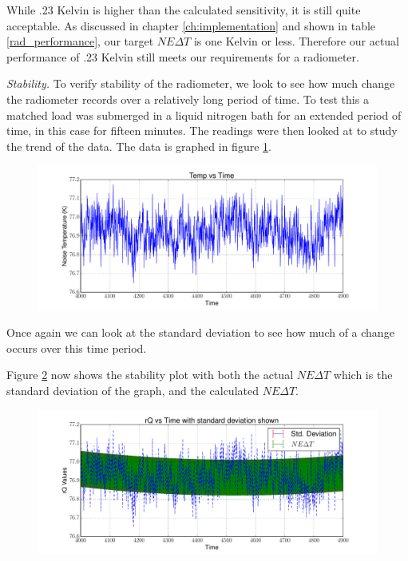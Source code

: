 {While .23 Kelvin is higher than the calculated sensitivity, it is still quite acceptable.  As discussed in chapter \ref{ch:implementation} and shown in table \ref{rad_performance}, our target $NE\Delta T$ is one Kelvin or less.  Therefore our actual performance of .23 Kelvin still meets our requirements for a radiometer.

\emph{Stability.}  To verify stability of the radiometer, we look to see how much change the radiometer records over a relatively long period of time.  To test this a matched load was submerged in a liquid nitrogen bath for an extended period of time, in this case for fifteen minutes.  The readings were then looked at to study the trend of the data.  The data is graphed in figure \ref{Stability}.

\begin{figure}[h!tb] \centering
\includegraphics[width=\textwidth]{Experiments/Exp2/sdr_calibrated_zoom.pdf}
\label{Stability}
\end{figure}

Once again we can look at the standard deviation to see how much of a change occurs over this time period.  

Figure \ref{Stability_calib} now shows the stability plot with both the actual $NE\Delta T$ which is the standard deviation of the graph, and the calculated $NE\Delta T$.

\begin{figure}[h!tb] \centering
\includegraphics[width=\textwidth]{Experiments/Exp2/calib_vstime_stddev.pdf}
\label{Stability_calib}
\end{figure}

}
